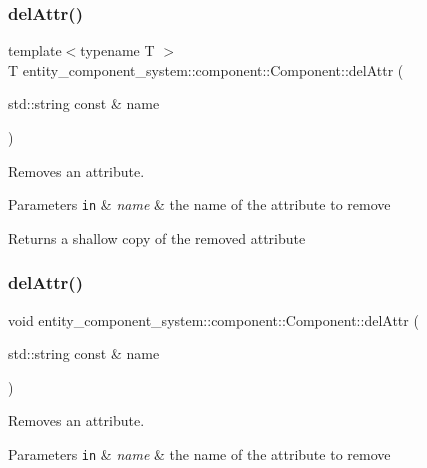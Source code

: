 \subsubsection{del\+Attr()\hspace{0.1cm}{\footnotesize\ttfamily [1/2]}}
{\footnotesize\ttfamily template$<$typename T $>$ \\
T entity\+\_\+component\+\_\+system\+::component\+::\+Component\+::del\+Attr (\begin{DoxyParamCaption}\item[{std\+::string const \&}]{name }\end{DoxyParamCaption})\hspace{0.3cm}{\ttfamily [inline]}}



Removes an attribute. 


\begin{DoxyParams}[1]{Parameters}
\mbox{\tt in}  & {\em name} & the name of the attribute to remove \\
\hline
\end{DoxyParams}
\begin{DoxyReturn}{Returns}
a shallow copy of the removed attribute 
\end{DoxyReturn}
\label{classentity__component__system_1_1component_1_1_component_a2975cbb2038ee0de41fd593528a84687} 
\subsubsection{del\+Attr()\hspace{0.1cm}{\footnotesize\ttfamily [2/2]}}
{\footnotesize\ttfamily void entity\+\_\+component\+\_\+system\+::component\+::\+Component\+::del\+Attr (\begin{DoxyParamCaption}\item[{std\+::string const \&}]{name }\end{DoxyParamCaption})\hspace{0.3cm}{\ttfamily [inline]}}



Removes an attribute. 


\begin{DoxyParams}[1]{Parameters}
\mbox{\tt in}  & {\em name} & the name of the attribute to remove \\
\hline
\end{DoxyParams}
\label{classentity__component__system_1_1component_1_1_component_adf16101ac90dc84d606a2b0abc69f65c} 
